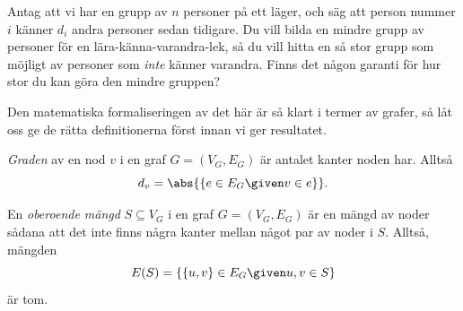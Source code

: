 \documentclass[nobib]{tufte-handout}
\begin{document}
Antag att vi har en grupp av $n$ personer på ett läger, och säg att person nummer $i$ känner $d_i$ andra personer sedan tidigare. Du vill bilda en mindre grupp av personer för en lära-känna-varandra-lek, så du vill hitta en så stor grupp som möjligt av personer som \emph{inte} känner varandra. Finns det någon garanti för hur stor du kan göra den mindre gruppen?

Den matematiska formaliseringen av det här är så klart i termer av grafer, så låt oss ge de rätta definitionerna först innan vi ger resultatet.

\begin{definition}
    \emph{Graden} av en nod $v$ i en graf $G = (V_G, E_G)$ är antalet kanter noden har. Alltså
    $$d_v = \abs{\left\{e \in E_G \given v \in e\right\}}.$$
\end{definition}

\begin{definition}
    En \emph{oberoende mängd} $S \subseteq V_G$ i en graf $G = (V_G, E_G)$ är en mängd av noder sådana att det inte finns några kanter mellan något par av noder i $S$. Alltså, mängden
    $$E(S) = \left\{\{u,v\} \in E_G \given u, v \in S\right\}$$
    är tom.
\end{definition}
\end{document}
